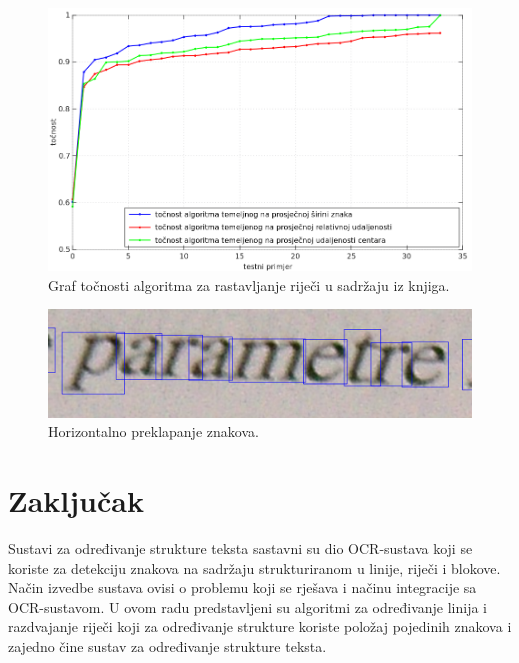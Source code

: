 \documentclass[times, utf8, zavrsni]{fer}
\begin{document}
\begin{figure}[htb]
    \centering
    \captionsetup{justification=centering,margin=2cm}
    \includegraphics[width=\textwidth]{images/result-04.png}
    \caption{
        Graf točnosti algoritma za rastavljanje riječi u sadržaju iz knjiga.
    }
    \label{fig:result-04}
\end{figure}

\begin{figure}[htb]
    \centering
    \captionsetup{justification=centering,margin=2cm}
    \includegraphics[width=\textwidth]{images/error-02.png}
    \caption{
        Horizontalno preklapanje znakova.
    }
    \label{fig:error-02}
\end{figure}


























\chapter{Zaključak}
Sustavi za određivanje strukture teksta sastavni su dio OCR-sustava koji se
koriste za detekciju znakova na sadržaju strukturiranom u linije, riječi i
blokove. Način izvedbe sustava ovisi o problemu koji se rješava i načinu
integracije sa OCR-sustavom. U ovom radu predstavljeni su algoritmi za
određivanje linija i razdvajanje riječi koji za određivanje
strukture koriste položaj pojedinih znakova i zajedno čine sustav za određivanje
strukture teksta.
\end{document}
